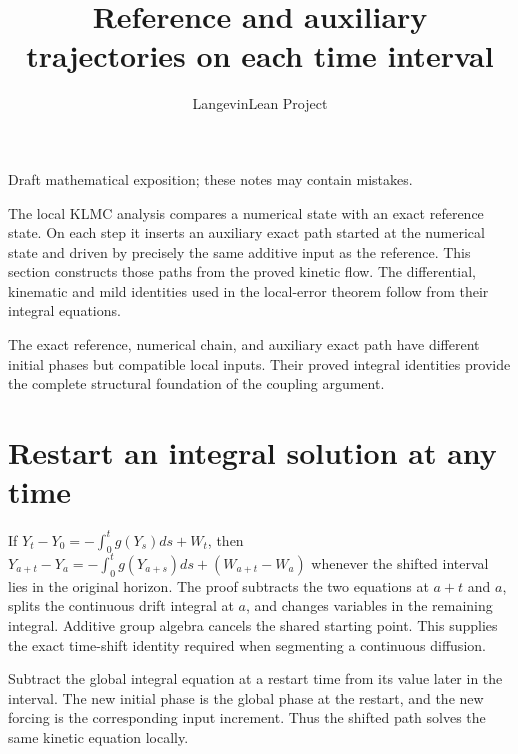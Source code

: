 \documentclass[11pt,a4paper]{article}
\title{\texorpdfstring{Reference and auxiliary trajectories on each time interval}{Reference and auxiliary trajectories on each time interval}}
\author{LangevinLean Project}
\date{}
\begin{document}
\maketitle
Draft mathematical exposition; these notes may contain mistakes.


The local KLMC analysis compares a numerical state with an exact reference state. On each step it inserts an auxiliary exact path started at the numerical state and driven by precisely the same additive input as the reference. This section constructs those paths from the proved kinetic flow. The differential, kinematic and mild identities used in the local-error theorem follow from their integral equations.



The exact reference, numerical chain, and auxiliary exact path have different initial phases but compatible local inputs. Their proved integral identities provide the complete structural foundation of the coupling argument.


\section{\texorpdfstring{Restart an integral solution at any time}{Restart an integral solution at any time}}


If \(Y_t-Y_0=-\int_0^tg(Y_s)ds+W_t\), then \(Y_{a+t}-Y_a=-\int_0^tg(Y_{a+s})ds+(W_{a+t}-W_a)\) whenever the shifted interval lies in the original horizon. The proof subtracts the two equations at \(a+t\) and \(a\), splits the continuous drift integral at \(a\), and changes variables in the remaining integral. Additive group algebra cancels the shared starting point. This supplies the exact time-shift identity required when segmenting a continuous diffusion.



Subtract the global integral equation at a restart time from its value later in the interval. The new initial phase is the global phase at the restart, and the new forcing is the corresponding input increment. Thus the shifted path solves the same kinetic equation locally.
\end{document}

